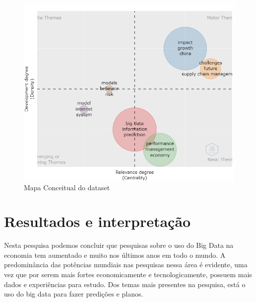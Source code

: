 \begin{figure}[ht]
    \centering
    \includegraphics[width=12cm]{experiments/Tong00020/PesquisaBibliometrica/Conceptual Structure/MASSA@Tong00020-Thematic Map.png}
    \caption{Mapa Conceitual do dataset}
    \label{fig:map-th}
\end{figure}



\section{Resultados e interpretação}
Nesta pesquisa podemos concluir que pesquisas sobre o uso do Big Data na economia tem aumentado e muito nos últimos anos em todo o mundo. A predominância das potências mundiais nas pesquisas nessa área é evidente, uma vez que por serem mais fortes economicamente e tecnologicamente, possuem mais dados e experiências para estudo. Dos temas mais presentes na pesquisa, está o uso do big data para fazer predições e planos.